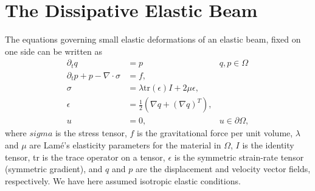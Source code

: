 \documentclass[12pt]{article}
\begin{document}
\maketitle

\section{The Dissipative Elastic Beam}
The equations governing small elastic deformations of an elastic beam, fixed on one side can be written as
\begin{equation} \label{eq:1}
\begin{aligned}
	\partial_{t} q &= p & q,p \in \Omega \\
	\partial_{t} p + p -\nabla\cdot \sigma &= f,\\
	\sigma &= \lambda \text{tr}(\epsilon)I + 2 \mu\epsilon, & \\
	\epsilon &= \frac 1 2 \left( \nabla q + (\nabla q)^T \right), & \\
	u &= 0, & u\in \partial \Omega,
\end{aligned}
\end{equation}
where $sigma$ is the stress tensor, $f$ is the gravitational force per unit volume, $\lambda$ and $\mu$ are Lam\'e's elasticity parameters for the material in $\Omega$, $I$ is the identity tensor, tr is the trace operator on a tensor, $\epsilon$ is the symmetric strain-rate tensor (symmetric gradient), and $q$ and $p$ are the displacement and velocity vector fields, respectively. We have here assumed isotropic elastic conditions.
\end{document}
